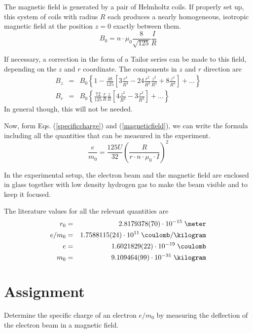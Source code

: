 \documentclass[a4paper,10pt]{article}
\begin{document}
The magnetic field is generated by a pair of Helmholtz coils. If properly set up, this system of coils with radius $R$ each produces a nearly homogeneous, isotropic magnetic field at the position $z=0$ exactly between them.
\begin{equation}
B_0 = n \cdot \mu_0 \frac{8}{\sqrt{125}} \frac{I}{R} \label{magneticfield}
\end{equation}

If necessary, a correction in the form of a Tailor series can be made to this field, depending on the $z$ and $r$ coordinate. The components in $z$ and $r$ direction are
\begin{eqnarray}
B_z &=& B_0 \left\{ 1- \frac{48}{125} \left[ 3 \frac{r^4}{R^4} - 24 \frac{r^2}{R^2} \frac{z^2}{R^2} + 8 \frac{z^4}{R^4} \right] + \dots \right\}\\
B_r &=& B_0 \left\{ \frac{72}{125} \frac{r}{R} \frac{z}{R} \left[ 4 \frac{z^2}{R^2} - 3 \frac{r^2}{R^2} \right] + \dots \right\}
\end{eqnarray}
In general though, this will not be needed.

Now, form Eqs. (\ref{specificcharge}) and (\ref{magneticfield}), we can write the formula including all the quantities that can be measured in the experiment.
\begin{equation}
\frac{e}{m_0} = \frac{125 U}{32} \left( \frac{R}{r \cdot n \cdot \mu_0 \cdot I} \right)^2 \label{meq}
\end{equation}

In the experimental setup, the electron beam and the magnetic field are enclosed in glass together with low density hydrogen gas to make the beam visible and to keep it focused.

The literature values for all the relevant quantities are
\begin{eqnarray*}
r_0 &=& 2.8179378(70) \cdot 10^{-15} \; \meter\\
e/m_0 &=& 1.7588115(24) \cdot 10^{11} \: \coulomb/\kilogram\\
e &=& 1.6021829(22) \cdot 10^{-19} \; \coulomb\\
m_0 &=& 9.109464(99)\cdot 10^{-31} \; \kilogram
\end{eqnarray*}



\section{Assignment}
Determine the specific charge of an electron $e/m_0$ by measuring the deflection of the electron beam in a magnetic field.
\end{document}
